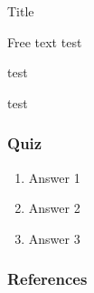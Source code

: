 \documentclass[11pt]{beamer}
\begin{document}
\begin{frame}{Title}



	\begin{block}{Free text}
		test
	\end{block}

  \begin{example}[asdf]
		test
	\end{example}

	\begin{theorem}[asdf]
		test
	\end{theorem}

\end{frame}


\begin{frame}
	\frametitle{Quiz}

	\begin{enumerate}
		\item Answer 1
		\item Answer 2
		\item Answer 3 \onslide<2->{\cmark}
	\end{enumerate}

\end{frame}

\begin{frame}[allowframebreaks]
  \frametitle{References}
  
  
\end{frame}
\end{document}
